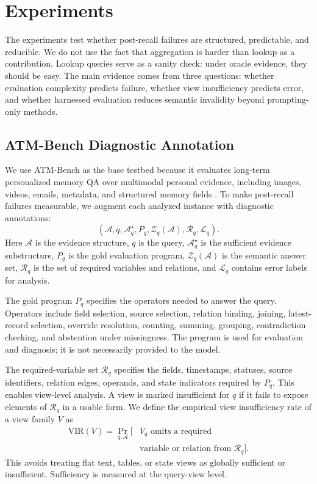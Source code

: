 \section{Experiments}
\label{sec:atm}

The experiments test whether post-recall failures are structured, predictable, and reducible.
We do not use the fact that aggregation is harder than lookup as a contribution.
Lookup queries serve as a sanity check: under oracle evidence, they should be easy.
The main evidence comes from three questions: whether evaluation complexity predicts failure, whether view insufficiency predicts error, and whether harnessed evaluation reduces semantic invalidity beyond prompting-only methods.

\subsection{ATM-Bench Diagnostic Annotation}
\label{subsec:benchmark-construction}

We use ATM-Bench as the base testbed because it evaluates long-term personalized memory QA over multimodal personal evidence, including images, videos, emails, metadata, and structured memory fields \cite{mei2026atm}.
To make post-recall failures measurable, we augment each analyzed instance with diagnostic annotations:
\begin{equation}
(\mathcal A, q, \mathcal A_q^\star, P_q, \mathcal Z_q(\mathcal A), \mathcal R_q, \mathcal L_q).
\label{eq:diagnostic-instance}
\end{equation}
Here $\mathcal A$ is the evidence structure, $q$ is the query, $\mathcal A_q^\star$ is the sufficient evidence substructure, $P_q$ is the gold evaluation program, $\mathcal Z_q(\mathcal A)$ is the semantic answer set, $\mathcal R_q$ is the set of required variables and relations, and $\mathcal L_q$ contains error labels for analysis.

The gold program $P_q$ specifies the operators needed to answer the query.
Operators include field selection, source selection, relation binding, joining, latest-record selection, override resolution, counting, summing, grouping, contradiction checking, and abstention under missingness.
The program is used for evaluation and diagnosis; it is not necessarily provided to the model.

The required-variable set $\mathcal R_q$ specifies the fields, timestamps, statuses, source identifiers, relation edges, operands, and state indicators required by $P_q$.
This enables view-level analysis.
A view is marked insufficient for $q$ if it fails to expose elements of $\mathcal R_q$ in a usable form.
We define the empirical view insufficiency rate of a view family $V$ as
\begin{equation}
\begin{aligned}
\mathrm{VIR}(V)
=
\Pr_{q,\mathcal A}
\big[
&V_q \text{ omits a required}\\
&\text{variable or relation from } \mathcal R_q
\big].
\end{aligned}
\label{eq:vir}
\end{equation}
This avoids treating flat text, tables, or state views as globally sufficient or insufficient.
Sufficiency is measured at the query-view level.


